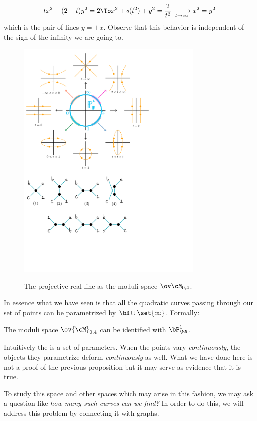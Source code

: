 \documentclass[11pt]{article}
\theoremstyle{definition}
\numberwithin{theorem}{section}
\begin{document}
$$tx^2+(2-t)y^2=2\To x^2+o(t^2)+y^2=\frac{2}{t^2}\xrightarrow[t\to\infty]{}x^2=y^2$$
which is the pair of lines $y=\pm x$. Observe that this behavior is independent of the sign of the infinity we are going to. 
\begin{figure}[h!]
    \centering
    \includegraphics[width=0.8\textwidth, trim= 0.25cm 13.1cm 5.25cm 0.5cm,clip]{fig2.pdf}
    \label{fig2}
    \caption{The projective real line as the moduli space $\ov\cM_{0,4}$.}
\end{figure}
In essence what we have seen is that all the quadratic curves passing through our set of points can be parametrized by $\bR\cup\set{\infty}$. Formally:
\begin{Prop}
The moduli space $\ov{\cM}_{0,4}$ can be identified with $\bP^1_\bR$.
\end{Prop}
Intuitively the  is a set of parameters. When the points vary \emph{continuously}, the objects they parametrize deform \emph{continuously} as well. What we have done here is not a proof of the previous proposition but it may serve as evidence that it is true.\par 
To study this space and other spaces which may arise in this fashion, we may ask a question like \emph{how many such curves can we find?} In order to do this, we will address this problem by connecting it with graphs. 
\end{document}
